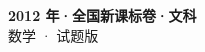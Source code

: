 \documentclass[zihao=-4, a4paper]{ctexart}
\begin{document}
\begin{center}
  {\Large\bfseries 2012 年·全国新课标卷·文科}\\[4pt]
  {\large 数学 · 试题版}
\end{center}
\medskip
{}

\end{document}
